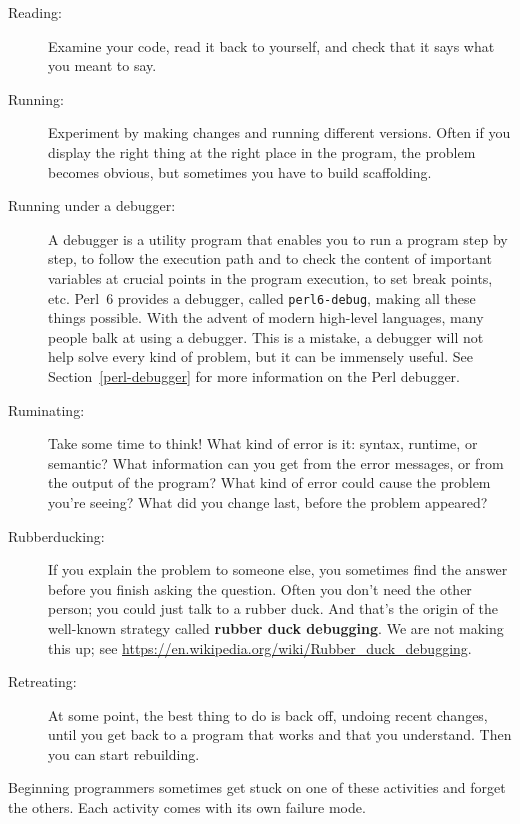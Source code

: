 \begin{description}

\item[Reading:] Examine your code, read it back to yourself, and
check that it says what you meant to say.

\item[Running:] Experiment by making changes and running different
versions.  Often if you display the right thing at the right place
in the program, the problem becomes obvious, but sometimes you have to
build scaffolding.

\item[Running under a debugger:] A debugger is a utility 
program that enables you to run a program step by step, 
to follow the execution path and to check the content of important 
variables at crucial points in the program execution, to set 
break points, etc. Perl~6 provides a debugger, called 
{\tt perl6-debug}, making all these things possible. With the 
advent of modern high-level languages, many people balk at 
using a debugger. This is a mistake, a debugger will not help 
solve every kind of problem, but it can be immensely 
useful. See Section~\ref{perl-debugger} for more information
on the Perl debugger.

\item[Ruminating:] Take some time to think!  What kind of error
is it: syntax, runtime, or semantic?  What information can you get from
the error messages, or from the output of the program?  What kind of
error could cause the problem you're seeing?  What did you change
last, before the problem appeared?

\item[Rubberducking:] If you explain the problem to someone else, you
sometimes find the answer before you finish asking the question.
Often you don't need the other person; you could just talk to a rubber
duck.  And that's the origin of the well-known strategy called {\bf
rubber duck debugging}.  We are not making this up; see
  \url{https://en.wikipedia.org/wiki/Rubber_duck_debugging}.

\item[Retreating:] At some point, the best thing to do is back
off, undoing recent changes, until you get back to a program that
works and that you understand.  Then you can start rebuilding.

\end{description}

Beginning programmers sometimes get stuck on one of these activities
and forget the others.  Each activity comes with its own failure
mode.

